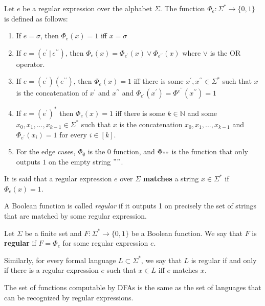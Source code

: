   \begin{definition}
  Let $e$ be a regular expression over the alphabet $\Sigma$. The function $\Phi_e : \Sigma^* \longrightarrow \{0,1\}$ is defined as follows: 
  \begin{enumerate}
      \item If $e = \sigma$, then $\Phi_e (x) = 1$ iff $x = \sigma$ 
      \item If $e = (e^\prime \,|\, e^{\prime\prime})$, then $\Phi_e (x) = \Phi_{e^\prime} (x) \vee \Phi_{e^{\prime\prime}} (x)$ where $\vee$ is the OR operator. 
      \item If $e = (e^\prime) (e^{\prime\prime})$, then $\Phi_e (x) = 1$ iff there is some $x^\prime, x^{\prime\prime} \in \Sigma^*$ such that $x$ is the concatenation of $x^\prime$ and $x^{\prime\prime}$ and $\Phi_{e^\prime} (x^\prime) = \Phi^{e^{\prime\prime}} (x^{\prime\prime}) = 1$ 
      \item If $e = (e^\prime)^*$ then $\Phi_e (x) = 1$ iff there is some $k \in \mathbb{N}$ and some $x_0, x_1, ..., x_{k-1} \in \Sigma^*$ such that $x$ is the concatenation $x_0, x_1, ..., x_{k-1}$ and $\Phi_{e^\prime} (x_i) = 1$ for every $i \in [k]$. 
      \item For the edge cases, $\Phi_{\emptyset}$ is the $0$ function, and $\Phi_{""}$ is the function that only outputs $1$ on the empty string $""$. 
  \end{enumerate}
  It is said that a regular expression $e$ over $\Sigma$ \textbf{matches} a string $x \in \Sigma^*$ if $\Phi_e (x) = 1$. 
  \end{definition}

  A Boolean function is called \textit{regular} if it outputs 1 on precisely the set of strings that are matched by some regular expression. 

  \begin{definition}
  Let $\Sigma$ be a finite set and $F: \Sigma^* \longrightarrow \{0,1\}$ be a Boolean function. We say that $F$ is \textbf{regular} if $F = \Phi_e$ for some regular expression $e$. 

  Similarly, for every formal language $L \subset \Sigma^*$, we say that $L$ is regular if and only if there is a regular expression $e$ such that $x \in L$ iff $e$ matches $x$. 
  \end{definition}

  \begin{definition}
  The set of functions computable by DFAs is the same as the set of languages that can be recognized by regular expressions. 
  \end{definition}

